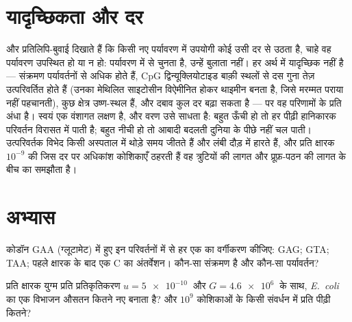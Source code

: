 \section{यादृच्छिकता और दर}

\begin{proposition}\label{prop:b2:genome-diversification:random}
 और प्रतिलिपि-बुवाई दिखाते हैं कि किसी नए पर्यावरण में
उपयोगी कोई  उसी दर से उठता है, चाहे वह पर्यावरण उपस्थित हो या
न हो: पर्यावरण  में से चुनता है, उन्हें बुलाता नहीं।
 हर अर्थ में यादृच्छिक नहीं है --- संक्रमण पर्यावर्तनों से
अधिक होते हैं, CpG द्विन्यूक्लियोटाइड बाक़ी स्थलों से दस गुना तेज़
उत्परिवर्तित होते हैं (उनका मेथिलित साइटोसीन विऐमीनित होकर थाइमीन बनता
है, जिसे मरम्मत पराया नहीं पहचानती), कुछ क्षेत्र उष्ण-स्थल हैं, और दबाव
कुल दर बढ़ा सकता है --- पर वह परिणामों के प्रति अंधा है।
 स्वयं एक वंशागत लक्षण है, और वरण उसे साधता है:
बहुत ऊँची हो तो हर पीढ़ी हानिकारक परिवर्तन विरासत में पाती है; बहुत नीची
हो तो आबादी बदलती दुनिया के पीछे नहीं चल पाती। उत्परिवर्तक विभेद किसी
अस्पताल में थोड़े समय जीतते हैं और लंबी दौड़ में हारते हैं, और प्रति
क्षारक $10^{-9}$ की जिस दर पर अधिकांश कोशिकाएँ ठहरती हैं वह त्रुटियों की
लागत और प्रूफ़-पठन की लागत के बीच का समझौता है।
\end{proposition}

\section{अभ्यास}

\begin{exercise}[$\star$]\label{exo:b2:genome-diversification:1}
कोडॉन GAA (ग्लूटामेट) में हुए इन परिवर्तनों में से हर एक का वर्गीकरण
कीजिए: GAG; GTA; TAA; पहले क्षारक के बाद एक C का अंतर्वेशन। कौन-सा
संक्रमण है और कौन-सा पर्यावर्तन?
\end{exercise}

\begin{exercise}[$\star$]\label{exo:b2:genome-diversification:2}
प्रति क्षारक युग्म प्रति प्रतिकृतिकरण $u = \qty{5e-10}{}$ और $G =
\qty{4.6e6}{}$ के साथ, \emph{E.~coli} का एक विभाजन औसतन कितने नए
 बनाता है? और $10^{9}$ कोशिकाओं के किसी संवर्धन में प्रति
पीढ़ी कितने?
\end{exercise}

